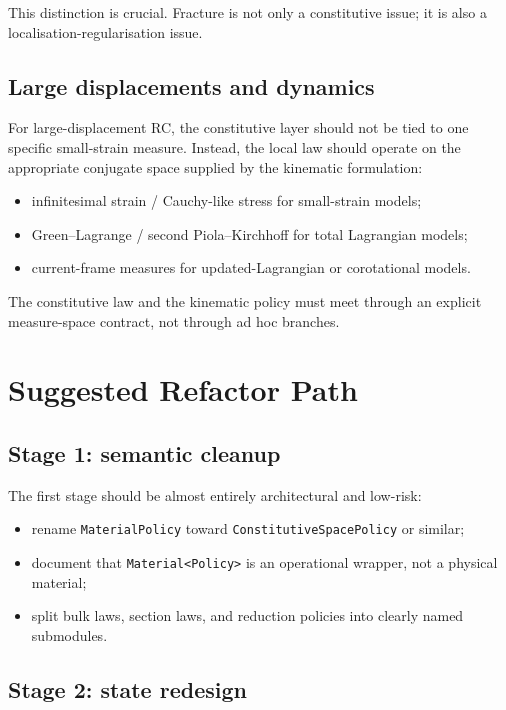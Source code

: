 This distinction is crucial.  Fracture is not only a constitutive issue; it is
also a localisation-regularisation issue.

\subsection{Large displacements and dynamics}

For large-displacement RC, the constitutive layer should not be tied to one
specific small-strain measure.  Instead, the local law should operate on the
appropriate conjugate space supplied by the kinematic formulation:
\begin{itemize}
  \item infinitesimal strain / Cauchy-like stress for small-strain models;
  \item Green--Lagrange / second Piola--Kirchhoff for total Lagrangian models;
  \item current-frame measures for updated-Lagrangian or corotational models.
\end{itemize}

The constitutive law and the kinematic policy must meet through an explicit
measure-space contract, not through ad hoc branches.

\section{Suggested Refactor Path}

\subsection{Stage 1: semantic cleanup}

The first stage should be almost entirely architectural and low-risk:
\begin{itemize}
  \item rename \texttt{MaterialPolicy} toward
        \texttt{ConstitutiveSpacePolicy} or similar;
  \item document that \texttt{Material<Policy>} is an operational wrapper, not
        a physical material;
  \item split bulk laws, section laws, and reduction policies into clearly
        named submodules.
\end{itemize}

\subsection{Stage 2: state redesign}

